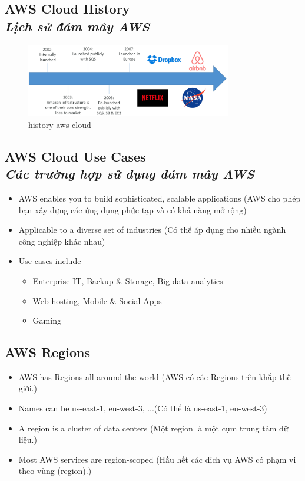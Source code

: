 \subsection[AWS Cloud History]{AWS Cloud History\\
	\textit{Lịch sử đám mây AWS}}
	
	\begin{figure}[htbp]
		\centering
		\includegraphics[width=0.8\textwidth]{images/history-aws-cloud}
		\caption{history-aws-cloud}
		\label{fig:history-aws-cloud}
	\end{figure}


\subsection[AWS Cloud Use Cases]{AWS Cloud Use Cases\\
	\textit{Các trường hợp sử dụng đám mây AWS}}
\begin{itemize}
	\item AWS enables you to build sophisticated, scalable applications (AWS cho phép bạn xây dựng các ứng dụng phức tạp và có khả năng mở rộng)
	\item Applicable to a diverse set of industries (Có thể áp dụng cho nhiều ngành công nghiệp khác nhau)
	\item Use cases include
	\begin{itemize}
		\item Enterprise IT, Backup \& Storage, Big data analytics	
		\item Web hosting, Mobile \& Social Apps
		\item Gaming
	\end{itemize}
\end{itemize}

\subsection[AWS Regions]{AWS Regions}

\begin{itemize}
	\item AWS has Regions all around the world (AWS có các Regions  trên khắp thế giới.)
	\item Names can be  us-east-1, eu-west-3, ...(Có thể là us-east-1, eu-west-3)
	\item A region is a cluster of data centers (Một region là một cụm trung tâm dữ liệu.)
	\item Most AWS services are region-scoped (Hầu hết các dịch vụ AWS có phạm vi theo vùng (region).)
\end{itemize}

